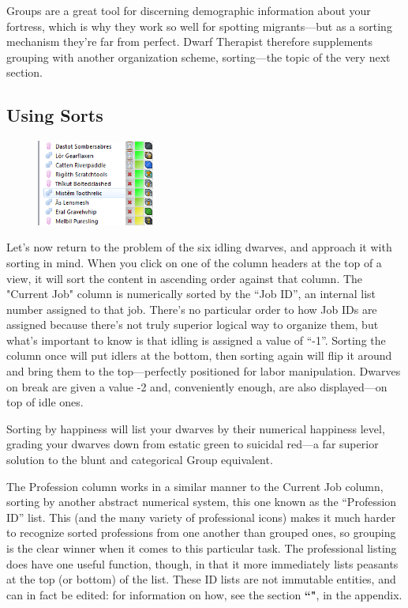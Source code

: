 \documentclass[]{article}
\begin{document}
Groups are a great tool for discerning demographic information about your fortress, which is why they
work so well for spotting migrants---but as a sorting mechanism they're far from perfect. Dwarf
Therapist therefore supplements grouping with another organization scheme, sorting---the topic of the
very next section.

\newpage
\subsection{Using Sorts}
\label{sec:Using Sorts}
\begin{figure}
\vspace{-20pt}
  \begin{center}
    \includegraphics[width=0.35\textwidth]{Sec2Fig10}
  \end{center}
\vspace{-10pt}
\end{figure}
Let's now return to the problem of the six idling dwarves, and approach it with sorting in mind. When you
click on one of the column headers at the top of a view, it will sort the content in ascending order
against that column. The "Current Job" column is numerically sorted by the ``Job ID'', an internal list
number assigned to that job. There's no particular order to how Job IDs are assigned because there's not
truly superior logical way to organize them, but what's important to know is that idling is assigned a
value of ``-1''. Sorting the column once will put idlers at the bottom, then sorting again will flip it
around and bring them to the top---perfectly positioned for labor manipulation. Dwarves on break are
given a value -2 and, conveniently enough, are also displayed---on top of idle ones.

Sorting by happiness will list your dwarves by their numerical happiness level, grading your dwarves
down from estatic green to suicidal red---a far superior solution to the blunt and categorical Group
equivalent.

The Profession column works in a similar manner to the Current Job column, sorting by another abstract
numerical system, this one known as the ``Profession ID'' list. This (and the many variety of
professional icons) makes it much harder to recognize sorted professions from one another than grouped
ones, so grouping is the clear winner when it comes to this particular task. The professional listing
does have one useful function, though, in that it more immediately lists peasants at the top (or
bottom) of the list. These ID lists are not immutable entities, and can in fact be edited: for
information on how, see the section \textbf{``"}, in the appendix.
\end{document}
